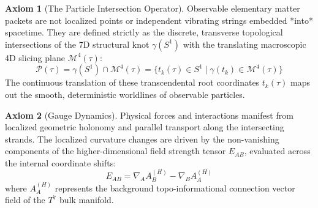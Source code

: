 \documentclass[12pt,letterpaper]{article}
\theoremstyle{definition}
\newtheorem{axiom}{Axiom}
\begin{document}
\begin{axiom}[The Particle Intersection Operator]
Observable elementary matter packets are not localized points or independent vibrating strings embedded *into* spacetime. They are defined strictly as the discrete, transverse topological intersections of the 7D structural knot $\gamma(S^1)$ with the translating macroscopic 4D slicing plane $\mathcal{M}^4(\tau)$:
\begin{equation}
    \mathcal{P}(\tau) = \gamma(S^1) \cap \mathcal{M}^4(\tau) = \{ t_k(\tau) \in S^1 \mid \gamma(t_k) \in \mathcal{M}^4(\tau) \}
\end{equation}
The continuous translation of these transcendental root coordinates $t_k(\tau)$ maps out the smooth, deterministic worldlines of observable particles.
\end{axiom}

\begin{axiom}[Gauge Dynamics]
Physical forces and interactions manifest from localized geometric holonomy and parallel transport along the intersecting strands. The localized curvature changes are driven by the non-vanishing components of the higher-dimensional field strength tensor $E_{AB}$, evaluated across the internal coordinate shifts:
\begin{equation}
    E_{AB} = \nabla_{A}A_{B}^{(H)} - \nabla_{B}A_{A}^{(H)}
\end{equation}
where $A_{A}^{(H)}$ represents the background topo-informational connection vector field of the $T^7$ bulk manifold.
\end{axiom}
\end{document}
